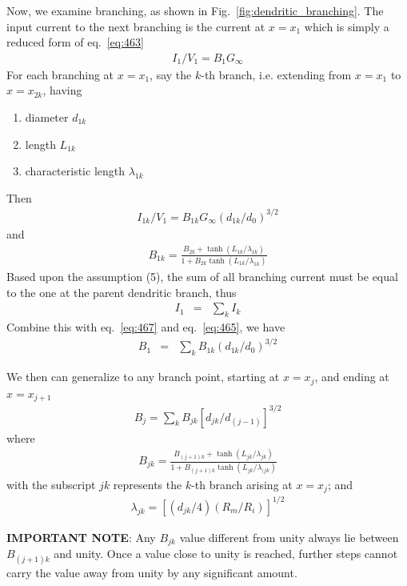 Now, we examine branching, as shown in
Fig.~\ref{fig:dendritic_branching}.  The input current to the next
branching is the current at $x=x_1$ which is simply a reduced form of
eq.~\eqref{eq:463}
\begin{eqnarray}
  \label{eq:467}
  I_1/V_1 = B_1 G_\infty
\end{eqnarray}
For each branching at $x=x_1$, say the $k$-th branch, i.e. extending
from $x=x_1$ to $x=x_{2k}$, having
\begin{enumerate}
\item diameter $d_{1k}$
\item length $L_{1k}$
\item characteristic length $\lambda_{1k}$
\end{enumerate}
Then
\begin{eqnarray}
  \label{eq:465}
  I_{1k}/V_1 = B_{1k} G_\infty (d_{1k}/d_0)^{3/2}
\end{eqnarray}
and
\begin{eqnarray}
  \label{eq:466}
  B_{1k}  = \frac{B_{2k}+\tanh(L_{1k}/\lambda_{1k})}{1+B_{2k}\tanh(L_{1k}/\lambda_{1k})}
\end{eqnarray}
Based upon the assumption (5), the sum of all branching current must
be equal to the one at the parent dendritic branch, thus
\begin{eqnarray*}
  I_1 &=& \sum_k I_k   
\end{eqnarray*}
Combine this with eq.~\eqref{eq:467} and eq.~\eqref{eq:465}, we have
\begin{eqnarray}
  \label{eq:469}
  B_1 &=& \sum_k B_{1k} (d_{1k}/d_0)^{3/2}
\end{eqnarray}

We then can generalize to any branch point, starting at $x=x_j$, and
ending at $x=x_{j+1}$
\begin{eqnarray}
  \label{eq:468}
  B_j = \sum_k B_{jk} \left[d_{jk}/d_{(j-1)}\right]^{3/2}
\end{eqnarray}
where 
\begin{eqnarray*}
  B_{jk} = \frac{B_{(j+1)k} + \tanh(L_{jk}/\lambda_{jk})}{1+B_{(j+1)k}\tanh(L_{jk}/\lambda_{(jk})}
\end{eqnarray*}
with the subscript $jk$ represents the $k$-th branch arising at
$x=x_j$; and
\begin{eqnarray}
  \label{eq:470}
  \lambda_{jk} = \left[ (d_{jk}/4)(R_m/R_i)\right]^{1/2}
\end{eqnarray}

{\bf IMPORTANT NOTE}: Any $B_{jk}$ value different from unity always
lie between $B_{(j+1)k}$ and unity. Once a value close to unity is
reached, further steps cannot carry the value away from unity by any
significant amount.


